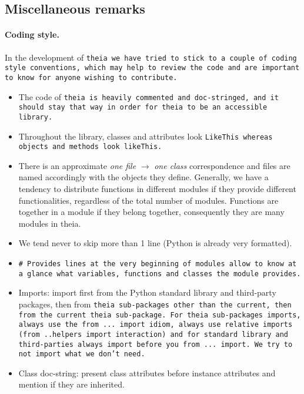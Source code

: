 \documentclass{article}
\begin{document}
\subsection{Miscellaneous remarks}

\paragraph{Coding style.}In the development of \tt{theia} we have tried to stick to a couple of coding style conventions, which may help to review the code and are important to know for anyone wishing to contribute.

\begin{itemize}
\item The code of \tt{theia} is heavily commented and doc-stringed, and it should stay that way in order for \tt{theia} to be an accessible library.

\item Throughout the library, classes and attributes look \tt{LikeThis} whereas objects and methods look \tt{likeThis}.

\item There is an approximate \textit{one file} $\rightarrow$ \textit{one class} correspondence and files are named accordingly with the objects they define. Generally, we have a tendency to distribute functions in different modules if they provide different functionalities, regardless of the total number of modules. Functions are together in a module if they belong together, consequently they are many modules in theia.

\item We tend never to skip more than 1 line (Python is already very formatted).

\item \tt{\# Provides} lines at the very beginning of modules allow to know at a glance what variables, functions and classes the module provides.

\item Imports: import first from the Python standard library and third-party packages, then from \tt{theia} sub-packages other than the current, then from the current \tt{theia} sub-package. For \tt{theia} sub-packages imports, always use the \tt{from ... import} idiom, always use relative imports (\tt{from ..helpers import interaction}) and for standard library and third-parties always \tt{import} before you \tt{from ... import}. We try to not import what we don't need.

\item Class doc-string: present class attributes before instance attributes and mention if they are inherited.
\end{itemize}
\end{document}
